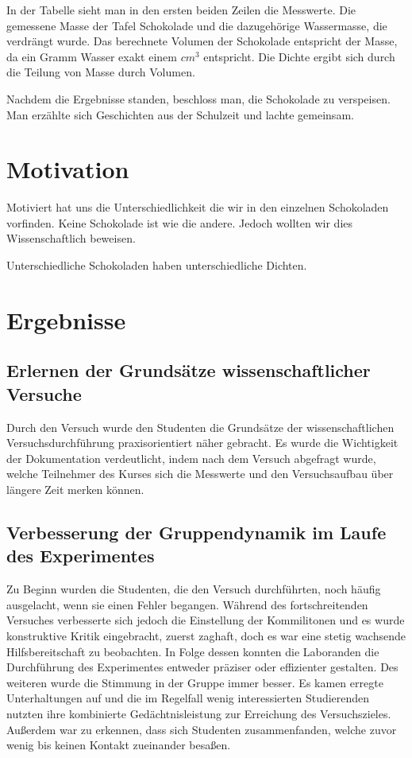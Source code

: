\documentclass[12pt]{scrartcl}
\begin{document}
In der Tabelle sieht man in den ersten beiden Zeilen die Messwerte. Die gemessene Masse der Tafel Schokolade und die dazugehörige Wassermasse, die verdrängt wurde. Das berechnete Volumen der Schokolade entspricht der Masse, da ein Gramm Wasser exakt einem $cm^3$ entspricht. Die Dichte ergibt sich durch die Teilung von Masse durch Volumen. 

Nachdem die Ergebnisse standen, beschloss man, die Schokolade zu verspeisen. Man erzählte sich Geschichten aus der Schulzeit und lachte gemeinsam.
\section{Motivation}
Motiviert hat uns die Unterschiedlichkeit die wir in den einzelnen Schokoladen vorfinden. Keine Schokolade ist wie die andere. Jedoch wollten wir dies Wissenschaftlich beweisen.

Unterschiedliche Schokoladen haben unterschiedliche Dichten.
\section{Ergebnisse}
\subsection{Erlernen der Grundsätze wissenschaftlicher Versuche}
Durch den Versuch wurde den Studenten die Grundsätze der wissenschaftlichen Versuchsdurchführung praxisorientiert näher gebracht. Es wurde die Wichtigkeit der Dokumentation verdeutlicht, indem nach dem Versuch abgefragt wurde, welche Teilnehmer des Kurses sich die Messwerte und den Versuchsaufbau über längere Zeit merken können.
\subsection{Verbesserung der Gruppendynamik im Laufe des Experimentes}
Zu Beginn wurden die Studenten, die den Versuch durchführten, noch häufig ausgelacht, wenn sie einen Fehler begangen. Während des fortschreitenden Versuches verbesserte sich jedoch die Einstellung der Kommilitonen und es wurde konstruktive Kritik eingebracht, zuerst zaghaft, doch es war eine stetig wachsende Hilfsbereitschaft zu beobachten. In Folge dessen konnten die Laboranden die Durchführung des Experimentes entweder präziser oder effizienter gestalten. Des weiteren wurde die Stimmung in der Gruppe immer besser. Es kamen erregte Unterhaltungen auf und die im Regelfall wenig interessierten Studierenden nutzten ihre kombinierte Gedächtnisleistung zur Erreichung des Versuchszieles. Außerdem war zu erkennen, dass sich Studenten zusammenfanden, welche zuvor wenig bis keinen Kontakt zueinander besaßen.
\end{document}
